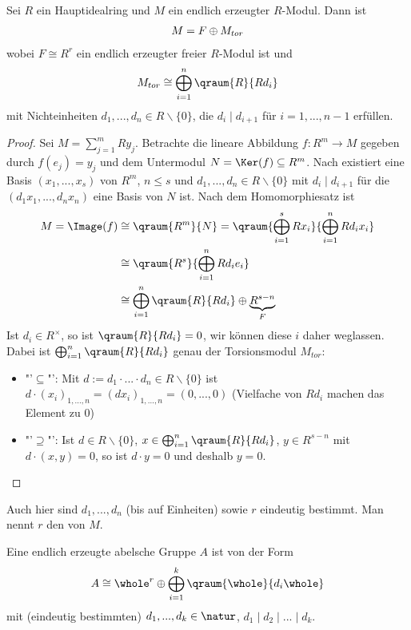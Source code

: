 \begin{theorem}
	Sei $R$ ein Hauptidealring und $M$ ein endlich erzeugter $R$-Modul. Dann ist
	\begin{align}
		M = F\oplus M_{tor}\notag
	\end{align}
	wobei $F\cong R^r$ ein endlich erzeugter freier $R$-Modul ist und
	\begin{align}
		M_{tor} \cong \bigoplus_{i=1}^n \qraum{R}{Rd_i}\notag
	\end{align}
	mit Nichteinheiten $d_1,...,d_n\in R\backslash\{0\}$, die $d_i\mid d_{i+1}$ für $i=1,...,n-1$ erfüllen.
\end{theorem}
\begin{proof}
	Sei $M=\sum_{j=1}^m Ry_j$. Betrachte die lineare Abbildung $f:R^m\to M$ gegeben durch $f(e_j)=y_j$ und dem Untermodul $N=\Ker(f)\subseteq R^m$. Nach  existiert eine Basis $(x_1,...,x_s)$ von $R^m$, $n\le s$ und $d_1,...,d_n\in R\backslash\{0\}$ mit $d_i\mid d_{i+1}$ für die $(d_1x_1,...,d_nx_n)$ eine Basis von $N$ ist. Nach dem Homomorphiesatz ist
	\begin{align}
		M=\Image(f)&\cong\qraum{R^m}{N}=\qraum{\bigoplus_{i=1}^s Rx_i}{\bigoplus_{i=1}^n Rd_ix_i} \notag \\
		&\cong \qraum{R^s}{\bigoplus_{i=1}^n Rd_ie_i}\notag \\
		&\cong \bigoplus_{i=1}^n \qraum{R}{Rd_i}\oplus \underbrace{R^{s-n}}_{F}\notag
	\end{align}
	Ist $d_i\in R^\times$, so ist $\qraum{R}{Rd_i}=0$, wir können diese $i$ daher weglassen. Dabei ist $\bigoplus_{i=1}^n \qraum{R}{Rd_i}$ genau der Torsionsmodul $M_{tor}$:
	\begin{itemize}
		\item "'$\subseteq$"': Mit $d:=d_1\cdot ... \cdot d_n\in R\backslash\{0\}$ ist $d\cdot (x_i)_{1,...,n}=(dx_i)_{1,...,n}=(0,...,0)$ (Vielfache von $Rd_i$ machen das Element zu 0)
		\item "'$\supseteq$"': Ist $d\in R\backslash\{0\}$, $x\in\bigoplus_{i=1}^n\qraum{R}{Rd_i}$, $y\in R^{s-n}$ mit $d\cdot (x,y)=0$, so ist $d\cdot y=0$ und deshalb $y=0$.
	\end{itemize}
\end{proof}

\begin{remark}
	Auch hier sind $d_1,...,d_n$ (bis auf Einheiten) sowie $r$ eindeutig bestimmt. Man nennt $r$ den  von $M$.
\end{remark}

\begin{example}
	Eine endlich erzeugte abelsche Gruppe $A$ ist von der Form
	\begin{align}
		A\cong \whole^r\oplus\bigoplus_{i=1}^k \qraum{\whole}{d_i\whole}\notag
	\end{align}
	mit (eindeutig bestimmten) $d_1,...,d_k\in\natur$, $d_1\mid d_2\mid ...\mid d_k$.
\end{example}